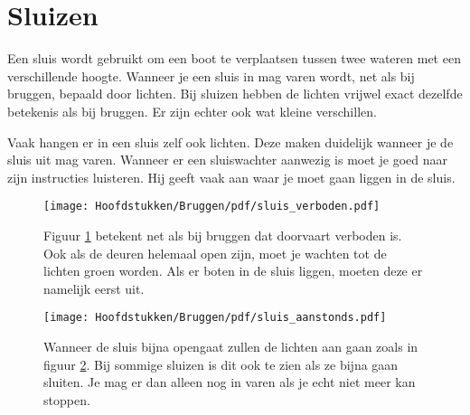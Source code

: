 \section{Sluizen}
Een sluis wordt gebruikt om een boot te verplaatsen tussen twee wateren met een verschillende hoogte. Wanneer je een sluis in mag varen wordt, net als bij bruggen, bepaald door lichten.
Bij sluizen hebben de lichten vrijwel exact dezelfde betekenis als bij bruggen. Er zijn echter ook wat kleine verschillen. 

Vaak hangen er in een sluis zelf ook lichten. Deze maken duidelijk wanneer je de sluis uit mag varen. Wanneer er een sluiswachter aanwezig is moet je goed naar zijn instructies luisteren. Hij geeft vaak aan waar je moet gaan liggen in de sluis. 

\hfill
\begin{figure}[H]
	\centering
	\begin{minipage}[b]{0.18\textwidth}
		\texttt{[image: Hoofdstukken/Bruggen/pdf/sluis\_verboden.pdf]}
		\caption{}
		\label{pic:sluis:verbod}
	\end{minipage}
	\hfill
	\begin{minipage}[t]{0.75\textwidth}
		\vspace{-2cm}
		Figuur \ref{pic:sluis:verbod} betekent net als bij bruggen dat doorvaart verboden is. Ook als de deuren helemaal open zijn, moet je wachten tot de lichten groen worden. Als er boten in de sluis liggen, moeten deze er namelijk eerst uit.
	\end{minipage}
\end{figure}
\vspace{-0.35cm}
\begin{figure}[H]
	\centering
	\begin{minipage}[b]{0.18\textwidth}	
		\texttt{[image: Hoofdstukken/Bruggen/pdf/sluis\_aanstonds.pdf]}
		\caption{}
		\label{pic:sluis:aanstonds}
	\end{minipage}
	\hfill
	\begin{minipage}[t]{0.75\textwidth}
		\vspace{-2cm}
		Wanneer de sluis bijna opengaat zullen de lichten aan gaan zoals in figuur \ref{pic:sluis:aanstonds}. Bij sommige sluizen is dit ook te zien als ze bijna gaan sluiten. Je mag er dan alleen nog in varen als je echt niet meer kan stoppen.
	\end{minipage}
\end{figure}
\vspace{-0.35cm}
